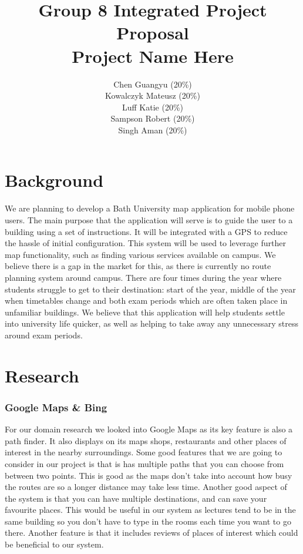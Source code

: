 \documentclass[10pt,a4paper,oneside]{report}
\begin{document}
\title{Group 8 Integrated Project Proposal\\Project Name Here}

\author{
  Chen Guangyu (20\%)\\
  Kowalczyk Mateusz (20\%)\\
  Luff Katie (20\%)\\
  Sampson Robert (20\%)\\
  Singh Aman (20\%)\\ }
\maketitle
\section*{Background}
We are planning to develop a Bath University map application for mobile phone users. The main purpose that the application will serve is to guide the user to a building using a set of instructions. It will be integrated with a GPS to reduce the hassle of initial configuration. This system will be used to leverage further map functionality, such as finding various services available on campus.
We believe there is a gap in the market for this, as there is currently no route planning system around campus. There are four times during the year where students struggle to get to their destination: start of the year, middle of the year when timetables change and both exam periods which are often taken place in unfamiliar buildings. We believe that this application will help students settle into university life quicker, as well as helping to take away any unnecessary stress around exam periods.

\section*{Research}
\subsubsection*{Google Maps \& Bing}
For our domain research we looked into Google Maps as its key feature is also a path finder. It also displays on its maps shops, restaurants and other places of interest in the nearby surroundings. Some good features that we are going to consider in our project is that is has multiple paths that you can choose from between two points. This is good as the maps don't take into account how busy the routes are so a longer distance may take less time. Another good aspect of the system is that you can have multiple destinations, and can save your favourite places. This would be useful in our system as lectures tend to be in the same building so you don't have to type in the rooms each time you want to go there. Another feature is that it includes reviews of places of interest which could be beneficial to our system.
\end{document}
